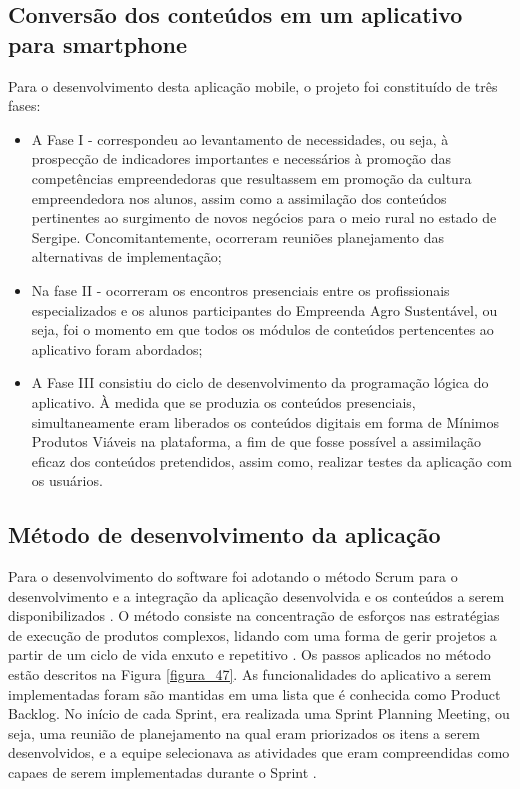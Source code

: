 \subsection{Conversão dos conteúdos em um aplicativo para smartphone}

Para o desenvolvimento desta aplicação mobile, o projeto foi constituído de três fases: 

\begin{itemize}
\item{A Fase I - correspondeu ao levantamento de necessidades, ou seja, à prospecção de indicadores importantes e necessários à promoção das competências empreendedoras que resultassem em promoção da cultura empreendedora nos alunos, assim como a assimilação dos conteúdos pertinentes ao surgimento de novos negócios para o meio rural no estado de Sergipe. Concomitantemente, ocorreram reuniões planejamento das alternativas de implementação;}
\item{Na fase II - ocorreram os encontros presenciais entre os profissionais especializados e os alunos participantes do Empreenda Agro Sustentável, ou seja, foi o momento em que todos os módulos de conteúdos pertencentes ao aplicativo foram abordados;}
\item{A Fase III consistiu do ciclo de desenvolvimento da programação lógica do aplicativo. À medida que se produzia os conteúdos presenciais, simultaneamente eram liberados os conteúdos digitais em forma de Mínimos Produtos Viáveis na plataforma, a fim de que fosse possível a assimilação eficaz dos conteúdos pretendidos, assim como, realizar testes da aplicação com os usuários.}
    
\end{itemize}

\subsection{Método de desenvolvimento da aplicação}

Para o desenvolvimento do software foi adotando o método Scrum para o desenvolvimento e a integração da aplicação desenvolvida e os conteúdos a serem disponibilizados \cite{schreier_solar_2017}. O método consiste na concentração de esforços nas estratégias de execução de produtos complexos, lidando com uma forma de gerir projetos a partir de um ciclo de vida enxuto e repetitivo \cite{bernardo_framework_2019}. Os passos aplicados no método estão descritos na Figura \ref{figura_47}. 
As funcionalidades do aplicativo a serem implementadas foram são mantidas em uma lista que é conhecida como Product Backlog. No início de cada Sprint, era realizada uma Sprint Planning Meeting, ou seja, uma reunião de planejamento na qual eram priorizados os itens a serem desenvolvidos, e a equipe selecionava as atividades que eram compreendidas como capaes de serem implementadas durante o Sprint \cite{trainning_education_services_curso_2018}.


